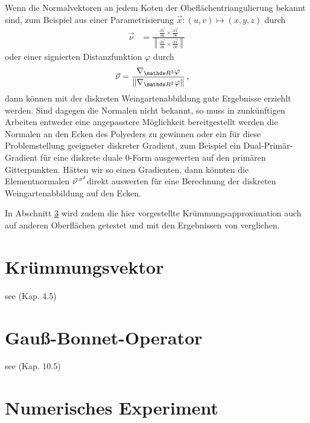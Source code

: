     \begin{fazit}
      Wenn die Normalvektoren an jedem Koten der Obeflächentriangulierung bekannt sind, zum Beispiel aus einer Parametrisierung
      \( \vec{x}: \left( u,v \right) \mapsto \left( x,y,z \right)\) durch
      \begin{align}
        \vec{\nu} &= \frac{\frac{\partial\vec{x}}{\partial u} \times \frac{\partial\vec{x}}{\partial v}}
                             {\left\| \frac{\partial\vec{x}}{\partial u} \times \frac{\partial\vec{x}}{\partial v} \right\|}
      \end{align}
      oder einer signierten Distanzfunktion \( \varphi \) durch
      \begin{align}
        \vec{\nu} &= \frac{\nabla_{\R^{3}}\varphi}{\left\| \nabla_{\R^{3}}\varphi \right\|} \formkomma
      \end{align}
      dann können mit der diskreten Weingartenabbildung gute Ergebnisse erziehlt werden.
      Sind dagegen die Normalen nicht bekannt, so muss in zunkünftigen Arbeiten entweder eine angepasstere Möglichkeit bereitgestellt
      werden die Normalen an den Ecken des Polyeders zu gewinnen oder ein für diese Problemstellung geeigneter diskreter Gradient,
      zum Beispiel ein Dual-Primär-Gradient für eine diskrete duale \( 0 \)-Form ausgewerten auf den primären Gitterpunkten.
      Hätten wir so einen Gradienten, dann könnten die Elementnormalen \( \vec{\nu}^{\,\sigma^{2}} \)direkt auswerten für eine
      Berechnung der diskreten Weingartenabbildung auf den Ecken.

      In Abschnitt \ref{secNumEx} wird zudem die hier vorgestellte Krümmungsapproximation auch auf anderen Oberflächen getestet und mit den
      Ergebnissen von \cite{heine} verglichen.
    \end{fazit}



\section{Krümmungsvektor}
see \cite{chen} (Kap. 4.5)

\section{Gauß-Bonnet-Operator}
see \cite{berger} (Kap. 10.5)


\section{Numerisches Experiment}
\label{secNumEx}
  
